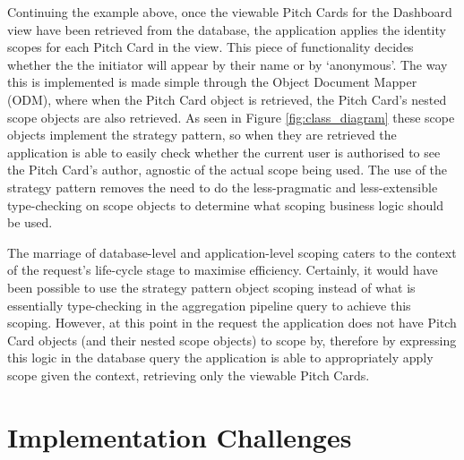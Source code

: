 Continuing the example above, once the viewable Pitch Cards for the Dashboard view have been retrieved from the database, the application applies the identity scopes for each Pitch Card in the view. This piece of functionality decides whether the the initiator will appear by their name or by `anonymous'. The way this is implemented is made simple through the Object Document Mapper (ODM), where when the Pitch Card object is retrieved, the Pitch Card's nested scope objects are also retrieved. As seen in Figure \ref{fig:class_diagram} these scope objects implement the strategy pattern, so when they are retrieved the application is able to easily check whether the current user is authorised to see the Pitch Card's author, agnostic of the actual scope being used. The use of the strategy pattern removes the need to do the less-pragmatic and less-extensible type-checking on scope objects to determine what scoping business logic should be used.
\par
The marriage of database-level and application-level scoping caters to the context of the request's life-cycle stage to maximise efficiency. Certainly, it would have been possible to use the strategy pattern object scoping instead of what is essentially type-checking in the aggregation pipeline query to achieve this scoping. However, at this point in the request the application does not have Pitch Card objects (and their nested scope objects) to scope by, therefore by expressing this logic in the database query the application is able to appropriately apply scope given the context, retrieving only the viewable Pitch Cards.

\section{Implementation Challenges}

